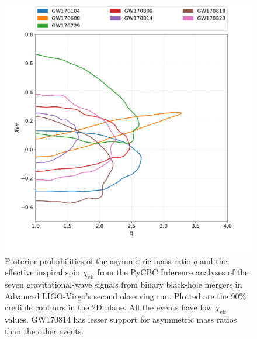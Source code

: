 \begin{figure}[ht]
  \includegraphics[width=\textwidth]{figures/o2_bbh_pe/all_o2_q_chieff.pdf}
  \caption{Posterior probabilities of the asymmetric mass ratio $q$ and the effective inspiral spin $\chi_{\mathrm{eff}}$ from the PyCBC Inference analyses of the seven gravitational-wave signals from binary black-hole mergers in Advanced LIGO-Virgo's second observing run. Plotted are the 90\% credible contours in the 2D plane. All the events have low $\chi_{\mathrm{eff}}$ values. GW170814 has lesser support for asymmetric mass ratios than the other events.
  \label{fig:qchieff_plots}
}
\end{figure}

